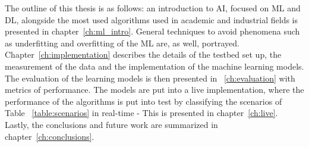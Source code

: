 The outline of this thesis is as follows:  an introduction to \ac{AI}, focused on \ac{ML} and \ac{DL}, alongside the most used algorithms used in academic and industrial fields is presented in chapter~\ref{ch:ml_intro}. General techniques to avoid phenomena such as underfitting and overfitting of the \ac{ML} are, as well, portrayed. Chapter~\ref{ch:implementation} describes the details of the testbed set up, the measurement of the data and the implementation of the machine learning models. The evaluation of the learning models is then presented in ~\ref{ch:evaluation} with metrics of performance. The models are put into a live implementation, where the performance of the algorithms is put into test by classifying the scenarios of Table ~\ref{table:scenarios} in real-time - This is presented in chapter~\ref{ch:live}. Lastly, the conclusions and future work are summarized in chapter~\ref{ch:conclusions}.
